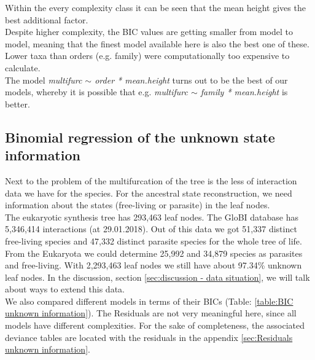       Within the every complexity class it can be seen that the mean height gives the best additional factor. \\
      Despite higher complexity, the BIC values are getting smaller from model to model, meaning that 
        the finest model available here is also the best one of these. Lower taxa than orders (e.g. 
        family) were computationally too expensive to calculate. \\
      The model \textit{multifurc $\sim$ order * mean.height} turns out to be the best of our models, 
        whereby it is possible that e.g. \textit{multifurc $\sim$ family * mean.height} is better.

    \subsection{Binomial regression of the unknown state information}

      Next to the problem of the multifurcation of the tree is the less of interaction data we have for 
        the species. For the ancestral state reconstruction, we need information about the states 
        (free-living or parasite) in the leaf nodes. \\
      The eukaryotic synthesis tree has 293,463 leaf nodes. The GloBI database has 5,346,414 interactions 
        (at 29.01.2018). Out of this data we got 51,337 distinct free-living species and 47,332 
        distinct parasite species for the whole tree of life. From the Eukaryota we could determine 
        25,992 and 34,879 species as parasites and free-living. With 2,293,463 leaf nodes we still have 
        about 97.34\% unknown leaf nodes. In the discussion, section 
        \ref{sec:discussion - data situation}, we will talk about ways to extend this data. \\
      
      We also compared different models in terms of their BICs (Table: \ref{table:BIC unknown information}). 
        The Residuals are not very meaningful here, since all models have different complexities. %
        For the sake of completeness, the associated deviance tables are located with the residuals in 
        the appendix \ref{sec:Residuals unknown information}.

